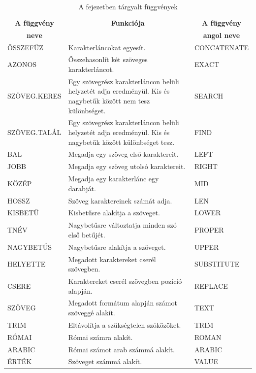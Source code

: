 \begin{table}[!h]
\begin{center}
\caption{A fejezetben tárgyalt függvények}\label{9-fejezetFüggvények}
\begin{tabular}{|m{3cm}|m{8cm}|m{3cm}|}
\hline
\multicolumn{1}{|c|}{\textbf{A függvény}}&
\multicolumn{1}{c|}{\textbf{Funkciója}}&
\multicolumn{1}{c|}{\textbf{A függvény}} \\
\multicolumn{1}{|c|}{\textbf{neve}} & &
\multicolumn{1}{c|}{\textbf{angol neve}} \\
\hline
ÖSSZEFŰZ & Karakterláncokat egyesít. & CONCATENATE\\ \hline
AZONOS & Összehasonlít két szöveges karakterláncot. & EXACT\\ \hline
SZÖVEG.KERES & Egy szövegrész karakterláncon belüli helyzetét adja eredményül.
Kis és nagybetűk között nem tesz különbséget. & SEARCH\\ \hline
SZÖVEG.TALÁL & Egy szövegrész karakterláncon belüli helyzetét adja
eredményül. Kis és nagybetűk között különbséget tesz. & FIND\\ \hline
BAL & Megadja egy szöveg első karaktereit. & LEFT\\ \hline
JOBB & Megadja egy szöveg utolsó karaktereit. & RIGHT\\ \hline
KÖZÉP & Megadja egy karakterlánc egy darabját. & MID\\ \hline
HOSSZ & Szöveg karaktereinek számát adja. & LEN\\ \hline
KISBETŰ & Kisbetűsre alakítja a szöveget. & LOWER\\ \hline
TNÉV & Nagybetűsre változtatja minden szó első betűjét. & PROPER\\ \hline
NAGYBETŰS & Nagybetűsre alakítja a szöveget. & UPPER\\ \hline
HELYETTE & Megadott karaktereket cserél szövegben. & SUBSTITUTE\\ \hline
CSERE & Karaktereket cserél szövegben pozíció alapján. & REPLACE\\ \hline
SZÖVEG & Megadott formátum alapján számot szöveggé alakít. & TEXT\\ \hline
TRIM & Eltávolítja a szükségtelen szóközöket. & TRIM\\ \hline
RÓMAI & Római számra alakít. &  ROMAN\\ \hline
ARABIC & Római számot arab számmá alakít. & ARABIC\\ \hline
ÉRTÉK & Szöveget számmá alakít. & VALUE\\ \hline
\end{tabular}
\end{center}
\end{table}

